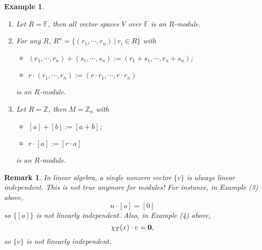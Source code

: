 \documentclass[12pt]{amsbook}
\newtheorem{example}[theorem]{Example}
\newtheorem{remark}[theorem]{Remark}
\begin{document}
\begin{example}\label{eg-importanteg}
    \begin{enumerate}
        \item Let $R = \mathbb{F}$, then all vector spaces $V$ over $\mathbb{F}$ is an $R$-module.
        \item For any $R$, $R^{n} = \{ (r_1,\cdots,r_n) \ |\ r_i \in R \}$ with
            \begin{itemize}
                \item $(r_1,\cdots,r_n)+(s_1,\cdots,s_n) := (r_1+s_1,\cdots,r_n+s_n)$;
                \item $r \cdot (r_1,\cdots,r_n) := (r \cdot r_1,\cdots,r \cdot r_n)$
            \end{itemize}
            is an $R$-module.
        \item Let $R = \mathbb{Z}$, then $M = \mathbb{Z}_{n}$ with
            \begin{itemize}
                \item $[a]+[b]:=[a+b]$;
                \item $r \cdot [a]:=[r \cdot a]$
            \end{itemize}
            is an $R$-module.

    \end{enumerate}
\end{example}

\begin{remark}
    In linear algebra, a single nonzero vector $\{ v \}$ is always linear independent. This is not true anymore for modules! For instance, in Example (3) above, 
    $$n \cdot [a] = [0]$$
    so $\{[a]\}$ is not linearly independent. Also, in Example (4) above,
    $$\chi_T(x) \cdot v = {\bf 0},$$
    so $\{v\}$ is not linearly independent.
\end{remark}
\end{document}
